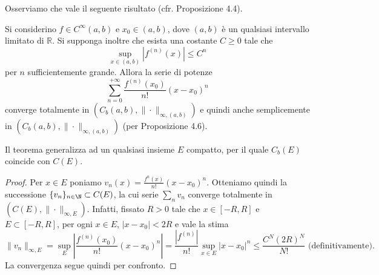 Osserviamo che vale il seguente risultato (cfr. Proposizione 4.4).
\begin{corollary}[$\circ$]
    Si considerino $f \in C^{\infty}(a, b)$ e $x_{0} \in(a, b)$, dove $(a, b)$ è un qualsiasi intervallo limitato di $\mathbb{R}$. Si supponga inoltre che esista una costante $C \geq 0$ tale che
    \[\sup _{x \in(a, b)}\left|f^{(n)}(x)\right| \leq C^{n}\]
    per $n$ sufficientemente grande. Allora la serie di potenze
    \[\sum_{n=0}^{+\infty} \frac{f^{(n)}\left(x_{0}\right)}{n!}\left(x-x_{0}\right)^{n}\]
    converge totalmente in $\left(C_{b}(a, b),\|\cdot\|_{\infty,(a, b)}\right)$ e quindi anche semplicemente in $\left(C_{b}(a, b), \| \cdot\|_{\infty,(a, b)}\right)$ (per Proposizione 4.6).
\end{corollary}
Il teorema generalizza ad un qualsiasi insieme $E$ compatto, per il quale $C_b(E)$ coincide con $C(E)$.
\begin{proof}
    Per $x\in E$ poniamo $v_n(x) = \frac{f^n(x)}{n!}(x-x_0)^n$. Otteniamo quindi la successione $\{v_n\}_{n\in \N}\subset C(E)$, la cui serie $\sum_nv_n$ converge totalmente in $(C(E),\|\cdot\|_{\infty, E})$. Infatti, fissato $R>0$ tale che $x\in [-R,R]$ e $E\subset [-R,R]$, per ogni $x\in E$, $|x-x_0|<2R$ e vale la stima
    \[\|v_n\|_{\infty, E} = \sup_E \left|\frac{f^{(n)}(x_0)}{n!}(x-x_0)^n\right| = \frac{|f^{(n)}|}{n!}\sup_{x\in E}|x-x_0|^n \leq \frac{C^N(2R)^N}{N!} \text{ (definitivamente).}\]
    La convergenza segue quindi per confronto. 
\end{proof}
    
